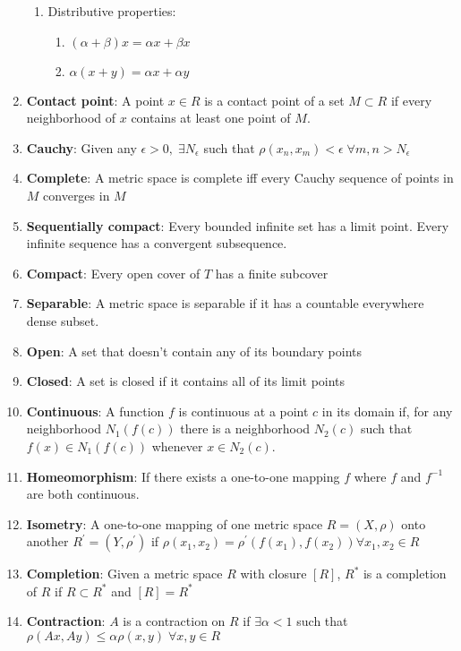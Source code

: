 \documentclass[12pt,letterpaper,reqno]{amsart}
\begin{document}
\begin{enumerate}[1.]
\begin{enumerate}
        \item Distributive properties:
        \begin{enumerate}
            \item $(\alpha + \beta)x = \alpha x + \beta x$
            \item $\alpha(x + y) = \alpha x + \alpha y$
        \end{enumerate}
    \end{enumerate}
\item \textbf{Contact point}: A point $x \in R$ is a contact point of a set $M \subset R$ if every neighborhood of $x$ contains at least one point of $M$.
\item \textbf{Cauchy}: Given any $\epsilon > 0, \; \exists N_\epsilon$ such that $\rho(x_n, x_m) < \epsilon \; \forall m, n > N_\epsilon$
\item \textbf{Complete}: A metric space is complete iff every Cauchy sequence of points in $M$ converges in $M$
\item \textbf{Sequentially compact}: Every bounded infinite set has a limit point. Every infinite sequence has a convergent subsequence.
\item \textbf{Compact}: Every open cover of $T$ has a finite subcover
\item \textbf{Separable}: A metric space is separable if it has a countable everywhere dense subset.
\item \textbf{Open}: A set that doesn't contain any of its boundary points
\item \textbf{Closed}: A set is closed if it contains all of its limit points
\item \textbf{Continuous}: A function $f$ is continuous at a point $c$ in its domain if, for any neighborhood $N_1(f(c))$ there is a neighborhood $N_2(c)$ such that $f(x) \in N_1(f(c))$ whenever $x \in N_2(c)$.
\item \textbf{Homeomorphism}: If there exists a one-to-one mapping $f$ where $f$ and $f^{-1}$ are both continuous.
\item \textbf{Isometry}: A one-to-one mapping of one metric space $R = (X,\rho)$ onto another $R^\prime = (Y,\rho^\prime)$ if $\rho \left(x_1, x _2\right) = \rho^\prime \left( f \left( x_1 \right) , f \left( x _ 2 \right) \right) \forall x_1, x_2 \in R$
\item \textbf{Completion}: Given a metric space $R$ with closure $[R]$, $R^*$ is a completion of $R$ if $R \subset R^*$ and $[R] = R^*$
\item \textbf{Contraction}: $A$ is a contraction on $R$ if $\exists \alpha < 1$ such that $\rho(Ax, Ay) \leq \alpha\rho(x,y) \; \forall x,y \in R$

\end{enumerate}
\end{document}
